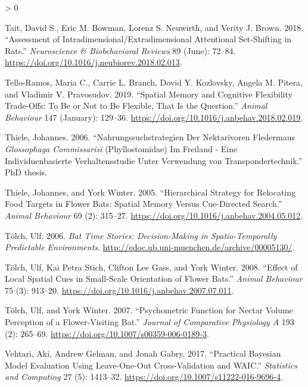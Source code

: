 \documentclass[
]{article}
\newlength{\cslhangindent}
\newenvironment{CSLReferences}[2] %
 {%
  \setlength{\parindent}{0pt}
  \ifodd #1 \everypar{\setlength{\hangindent}{\cslhangindent}}\ignorespaces\fi
  \ifnum #2 > 0
  \setlength{\parskip}{#2\baselineskip}
  \fi
 }%
 {}
\begin{document}
\begin{CSLReferences}{1}{0}
\leavevmode\hypertarget{ref-tait_assessment_2018}{}%
Tait, David S., Eric M. Bowman, Lorenz S. Neuwirth, and Verity J. Brown. 2018. {``Assessment of Intradimensional/Extradimensional Attentional Set-Shifting in Rats.''} \emph{Neuroscience \& Biobehavioral Reviews} 89 (June): 72--84. \url{https://doi.org/10.1016/j.neubiorev.2018.02.013}.

\leavevmode\hypertarget{ref-tello-ramos_spatial_2019}{}%
Tello-Ramos, Maria C., Carrie L. Branch, Dovid Y. Kozlovsky, Angela M. Pitera, and Vladimir V. Pravosudov. 2019. {``Spatial Memory and Cognitive Flexibility Trade-Offs: To Be or Not to Be Flexible, That Is the Question.''} \emph{Animal Behaviour} 147 (January): 129--36. \url{https://doi.org/10.1016/j.anbehav.2018.02.019}.

\leavevmode\hypertarget{ref-thiele_nahrungssuchstrategien_2006}{}%
Thiele, Johannes. 2006. {``Nahrungssuchstrategien Der Nektarivoren {Fledermaus} \emph{{Glossophaga} Commissarisi} ({Phyllostomidae}) Im {Freiland} - Eine Individuenbasierte {Verhaltensstudie} Unter {Verwendung} von {Transpondertechnik}.''} PhD thesis.

\leavevmode\hypertarget{ref-thiele_hierarchical_2005}{}%
Thiele, Johannes, and York Winter. 2005. {``Hierarchical Strategy for Relocating Food Targets in Flower Bats: Spatial Memory Versus Cue-Directed Search.''} \emph{Animal Behaviour} 69 (2): 315--27. \url{https://doi.org/10.1016/j.anbehav.2004.05.012}.

\leavevmode\hypertarget{ref-tolch_bat_2006}{}%
Tölch, Ulf. 2006. \emph{Bat Time Stories: Decision-Making in Spatio-Temporally Predictable Environments}. \url{http://edoc.ub.uni-muenchen.de/archive/00005130/}.

\leavevmode\hypertarget{ref-tolch_effect_2008}{}%
Tölch, Ulf, Kai Petra Stich, Clifton Lee Gass, and York Winter. 2008. {``Effect of Local Spatial Cues in Small-Scale Orientation of Flower Bats.''} \emph{Animal Behaviour} 75 (3): 913--20. \url{https://doi.org/10.1016/j.anbehav.2007.07.011}.

\leavevmode\hypertarget{ref-tolch_psychometric_2007}{}%
Tölch, Ulf, and York Winter. 2007. {``Psychometric Function for Nectar Volume Perception of a Flower-Visiting Bat.''} \emph{Journal of Comparative Physiology A} 193 (2): 265--69. \url{https://doi.org/10.1007/s00359-006-0189-3}.

\leavevmode\hypertarget{ref-vehtari_practical_2017}{}%
Vehtari, Aki, Andrew Gelman, and Jonah Gabry. 2017. {``Practical {Bayesian} Model Evaluation Using Leave-One-Out Cross-Validation and {WAIC}.''} \emph{Statistics and Computing} 27 (5): 1413--32. \url{https://doi.org/10.1007/s11222-016-9696-4}.


\end{CSLReferences}
\end{document}
